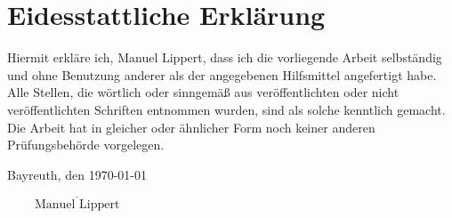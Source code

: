 \newpage
\chapter*{Eidesstattliche Erklärung}
\label{sec:eid}
\thispagestyle{empty}

\vspace*{0.1cm}
Hiermit erkläre ich, Manuel Lippert, dass ich die vorliegende Arbeit selbständig und ohne Benutzung anderer als der angegebenen Hilfsmittel angefertigt habe.
\bigskip
Alle Stellen, die wörtlich oder sinngemäß aus veröffentlichten oder nicht veröffentlichten Schriften entnommen wurden, sind als solche kenntlich gemacht.
\bigskip
Die Arbeit hat in gleicher oder ähnlicher Form noch keiner anderen Prüfungsbehörde vorgelegen.
\vspace{3cm}

\noindent Bayreuth, den \today
\begin{flushright}
$\overline{~~~~~~~~~~\mbox{Manuel Lippert}~~~~~~~~~~}$
\end{flushright}